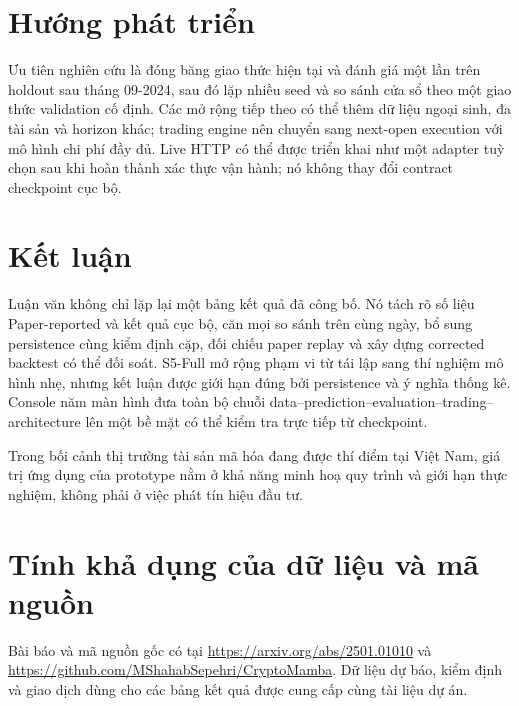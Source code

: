 \documentclass[13pt,a4paper,oneside]{report}
\begin{document}
\section{Hướng phát triển}\label{sec:future}
Ưu tiên nghiên cứu là đóng băng giao thức hiện tại và đánh giá một lần trên holdout sau tháng
09-2024, sau đó lặp nhiều seed và so sánh cửa sổ theo một giao thức validation cố định. Các mở rộng
tiếp theo có thể thêm dữ liệu ngoại sinh,
đa tài sản và horizon khác; trading engine nên chuyển sang next-open execution với mô hình chi phí
đầy đủ. Live HTTP có thể được triển khai như một adapter tuỳ chọn sau khi hoàn thành xác thực vận
hành; nó không thay đổi contract checkpoint cục bộ.

\newpage
\section{Kết luận}\label{sec:conclusion}
Luận văn không chỉ lặp lại một bảng kết quả đã công bố. Nó tách rõ số liệu Paper-reported và kết quả
cục bộ, căn mọi so sánh trên cùng ngày, bổ sung persistence cùng kiểm định cặp, đối chiếu paper replay
và xây dựng corrected backtest có thể đối soát. S5-Full mở rộng phạm vi từ tái lập sang thí nghiệm
mô hình nhẹ, nhưng kết luận được giới hạn đúng bởi persistence và ý nghĩa thống kê. Console năm màn
hình đưa toàn bộ chuỗi data--prediction--evaluation--trading--architecture lên một bề mặt có thể
kiểm tra trực tiếp từ checkpoint.

Trong bối cảnh thị trường tài sản mã hóa đang được thí điểm tại Việt Nam, giá trị ứng dụng của
prototype nằm ở khả năng minh hoạ quy trình và giới hạn thực nghiệm, không phải ở việc phát tín hiệu
đầu tư.

\section*{Tính khả dụng của dữ liệu và mã nguồn}\label{sec:availability}

Bài báo và mã nguồn gốc có tại \url{https://arxiv.org/abs/2501.01010} và
\url{https://github.com/MShahabSepehri/CryptoMamba}. Dữ liệu dự báo, kiểm định và giao dịch dùng cho
các bảng kết quả được cung cấp cùng tài liệu dự án.
\end{document}
